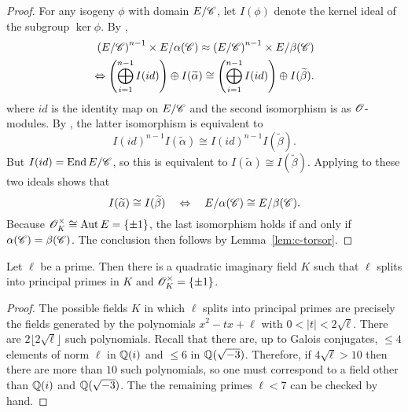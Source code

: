 \documentclass{amsart}
\begin{document}
\begin{proof}
  For any isogeny $\phi$ with domain $E/\mathscr{C}$, let $I(\phi)$ denote the kernel ideal of the subgroup $\ker\phi$.
  By \cite[Thm.~46]{kani2011products},
  \begin{align*}
    \left(E/\mathscr{C}\right)^{n-1} \times E/\alpha(\mathscr{C}) \approx \left(E/\mathscr{C}\right)^{n-1} \times E/\beta(\mathscr{C})
    \\
    \Leftrightarrow
    \left(\bigoplus_{i=1}^{n-1} I(id)\right) \oplus I(\widetilde{\alpha}) \cong \left(\bigoplus_{i=1}^{n-1} I(id)\right) \oplus I(\widetilde{\beta}).
  \end{align*}
  where $id$ is the identity map on $E/\mathscr{C}$ and the second isomorphism is as $\mathscr{O}$-modules. By \cite[Thm.~48]{kani2011products}, the latter isomorphism is equivalent to
  \[
    I(id)^{n-1}I(\tilde{\alpha}) \cong I(id)^{n-1}I(\tilde{\beta}).
  \]
  But $I(id) = \operatorname{End} E/\mathscr{C}$, so this is equivalent to $I(\tilde{\alpha}) \cong I(\tilde{\beta})$. Applying \cite[Thm.~46]{kani2011products} to these two ideals shows that
  \[
    I(\widetilde{\alpha}) \cong I(\widetilde{\beta})
    \quad\Leftrightarrow\quad
    E/\alpha(\mathscr{C}) \cong E/\beta(\mathscr{C}).
  \]
  Because $\mathscr{O}_K^\times \cong \operatorname{Aut} E = \{\pm 1\}$, the last isomorphism holds if and only if $\alpha(\mathscr{C}) = \beta(\mathscr{C})$. The conclusion then follows by Lemma~\ref{lem:c-torsor}.
\end{proof}

\begin{lemma}\label{lem:silly}
  Let $\ell$ be a prime. Then there is a quadratic imaginary field $K$ such that $\ell$ splits into principal primes in $K$ and $\mathscr{O}_K^\times = \{\pm 1\}$.
\end{lemma}
\begin{proof}
  The possible fields $K$ in which $\ell$ splits into principal primes are precisely the fields generated by the polynomials $x^2 - tx + \ell$ with $0 < |t| < 2\sqrt{\ell}$. There are $2\lfloor 2\sqrt{\ell} \rfloor$ such polynomials. Recall that there are, up to Galois conjugates, $\leq 4$ elements of norm $\ell$ in $\mathbb{Q}(i)$ and $\leq 6$ in $\mathbb{Q}(\sqrt{-3})$. Therefore, if $4\sqrt{\ell} > 10$ then there are more than $10$ such polynomials, so one must correspond to a field other than $\mathbb{Q}(i)$ and $\mathbb{Q}(\sqrt{-3})$. The the remaining primes $\ell < 7$ can be checked by hand.
\end{proof}
\end{document}
